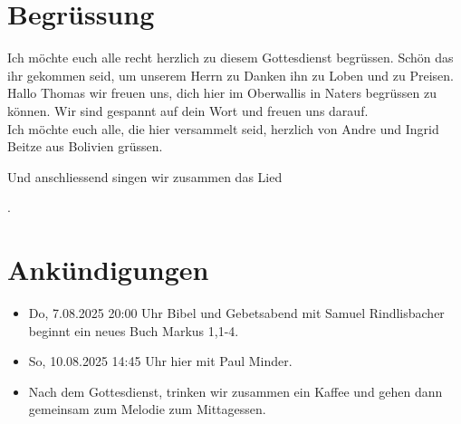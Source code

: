 \documentclass{../../inc/mybib}
\begin{document}
\section{Begrüssung}

Ich möchte euch alle recht herzlich zu diesem Gottesdienst begrüssen. Schön das ihr gekommen seid, um unserem Herrn zu Danken ihn zu Loben und zu Preisen.
Hallo Thomas wir freuen uns, dich hier im Oberwallis in Naters begrüssen zu können. Wir sind gespannt auf dein Wort und freuen uns darauf.\\
Ich möchte euch alle, die hier versammelt seid, herzlich von Andre und Ingrid Beitze aus Bolivien grüssen.

\beten{} Und anschliessend singen wir zusammen das Lied

{}.

\section{Ankündigungen}
\begin{itemize}
    \item {} Do, 7.08.2025 20:00 Uhr Bibel und Gebetsabend mit Samuel Rindlisbacher  beginnt ein neues Buch Markus 1,1-4.
    \item {} So, 10.08.2025 14:45 Uhr hier mit Paul Minder.
    \item {} Nach dem Gottesdienst, trinken wir zusammen ein Kaffee und gehen dann gemeinsam zum Melodie zum Mittagessen.
\end{itemize}
\end{document}
